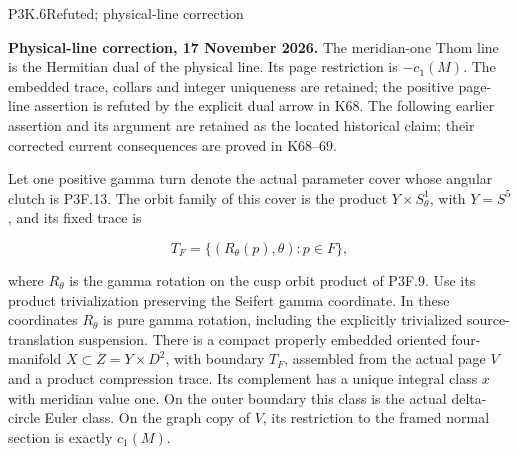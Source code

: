 \begin{statement}{P3K.6}{Refuted; physical-line correction}\par\noindent\textbf{Physical-line correction, 17 November 2026.} The meridian-one Thom line is the Hermitian dual of the physical line. Its page restriction is \(-c_1(M)\). The embedded trace, collars and integer uniqueness are retained; the positive page-line assertion is refuted by the explicit dual arrow in K68. The following earlier assertion and its argument are retained as the located historical claim; their corrected current consequences are proved in K68--69.\medskip\par 
Let one positive gamma turn denote the actual parameter cover whose
angular clutch is P3F.13.  The orbit family of this cover is the product
\(Y\times S^1_\theta\), with \(Y=S^5\), and its fixed trace is

\[
 T_F=\{(R_\theta(p),\theta):p\in F\},
\]

where \(R_\theta\) is the gamma rotation on the cusp orbit product of
P3F.9.  Use its product trivialization preserving the Seifert gamma
coordinate.  In these coordinates \(R_\theta\) is pure gamma
rotation, including the explicitly trivialized source-translation
suspension.  There is a compact properly embedded oriented four-manifold
\(X\subset Z=Y\times D^2\), with boundary \(T_F\), assembled from the
actual page \(V\) and a product compression trace.  Its complement
has a unique integral class \(x\) with meridian value one.  On the
outer boundary this class is the actual delta-circle Euler class.
On the graph copy of \(V\), its restriction to the framed normal
section is exactly \(c_1(M)\).
\end{statement}

